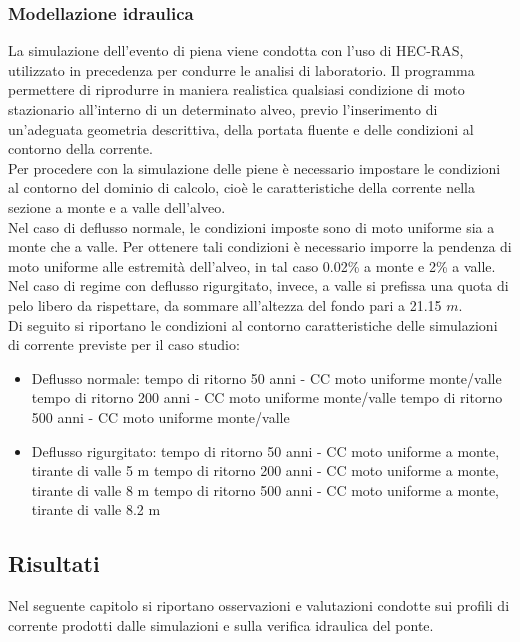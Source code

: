 \documentclass[12pt]{article} %
\begin{document}
\subsubsection{Modellazione idraulica}
\noindent La simulazione dell'evento di piena viene condotta con l'uso di HEC-RAS, utilizzato in precedenza per condurre le analisi di laboratorio. Il programma permettere di riprodurre in maniera realistica qualsiasi condizione di moto stazionario all'interno di un determinato alveo, previo l'inserimento di un'adeguata geometria descrittiva, della portata fluente e delle condizioni al contorno della corrente.\\
Per procedere con la simulazione delle piene è necessario impostare le condizioni al contorno del dominio di calcolo, cioè le caratteristiche della corrente nella sezione a monte e a valle dell'alveo.\\
Nel caso di deflusso normale, le condizioni imposte sono di moto uniforme sia a monte che a valle. Per ottenere tali condizioni è necessario imporre la pendenza di moto uniforme alle estremità dell'alveo, in tal caso 0.02\% a monte e 2\% a valle.\\
Nel caso di regime con deflusso rigurgitato, invece, a valle si prefissa una quota di pelo libero da rispettare, da sommare all'altezza del fondo pari a 21.15 $m$.\\
Di seguito si riportano le condizioni al contorno caratteristiche delle simulazioni di corrente previste per il caso studio:
\begin{itemize}
\item Deflusso normale:
    \subitem tempo di ritorno 50 anni - CC moto uniforme monte/valle
    \subitem tempo di ritorno 200 anni - CC moto uniforme monte/valle
    \subitem tempo di ritorno 500 anni - CC moto uniforme monte/valle
\item Deflusso rigurgitato:
\subitem tempo di ritorno 50 anni - CC moto uniforme a monte, tirante di valle 5 m
\subitem tempo di ritorno 200 anni - CC moto uniforme a monte, tirante di valle 8 m
\subitem tempo di ritorno 500 anni - CC moto uniforme a monte, tirante di valle 8.2 m

    
\end{itemize}

\newpage
\subsection{Risultati}

\noindent Nel seguente capitolo si riportano osservazioni e valutazioni condotte sui profili di corrente prodotti dalle simulazioni e sulla verifica idraulica del ponte.
\end{document}
